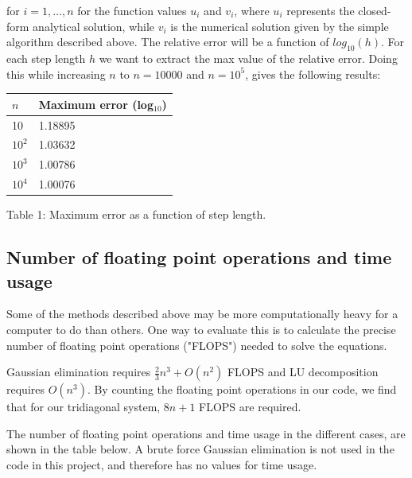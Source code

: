 \documentclass{article}
\begin{document}
\begin{multicols}{2}
\noindent for $i = 1, \dots, n$ for the function values $u_i$ and $v_i$, where $u_i$ represents the closed-form analytical solution, while $v_i$ is the numerical solution given by the simple algorithm described above. The relative error will be a function of $log_{10}(h)$. For each step length $h$ we want to extract the max value of the relative error. Doing this while increasing $n$ to $n=10000$ and $n=10^5$, gives the following results:

\begin{center}
\begin{tabular}{ l l }\hline
	$n$ 		&Maximum error (log$_{10}$) \\ \hline
	10 		& 1.18895 \\
	$10^2$  	& 1.03632 \\
	$10^3$ 	& 1.00786 \\
	$10^4$ 	& 1.00076 \\
	\hline
\end{tabular}
\end{center}

\begin{center}
Table 1: Maximum error as a function of step length.
\end{center}

\subsection{Number of floating point operations and time usage}
Some of the methods described above may be more computationally heavy for a computer to do than others. One way to evaluate this is to calculate the precise number of floating point operations ("FLOPS") needed to solve the equations.

Gaussian elimination requires $\frac{2}{3}n^3 + O(n^2)$ FLOPS and LU decomposition requires $O(n^3)$. By counting the floating point operations in our code, we find that for our tridiagonal system, $8n + 1$ FLOPS are required. 

The number of floating point operations and time usage in the different cases, are shown in the table below. A brute force Gaussian elimination is not used in the code in this project, and therefore has no values for time usage.



\end{multicols}
\end{document}
